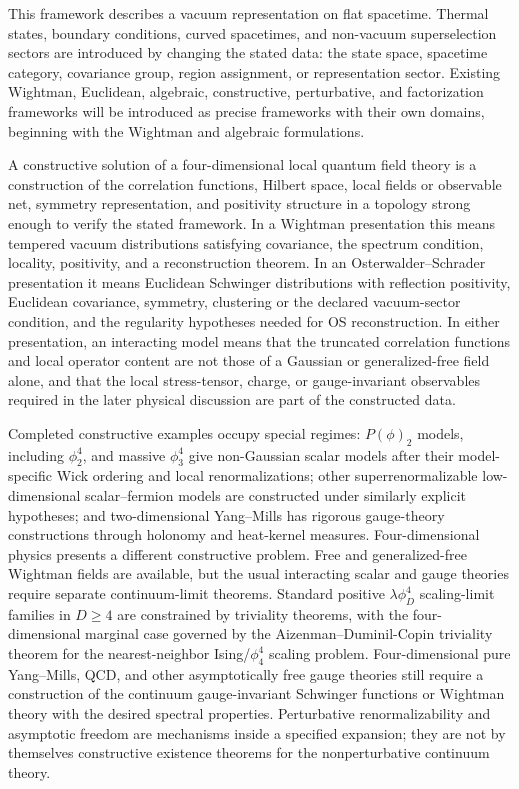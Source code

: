 This framework describes a vacuum representation on flat spacetime. Thermal
states, boundary conditions, curved spacetimes, and non-vacuum superselection
sectors are introduced by changing the stated data: the state space, spacetime
category, covariance group, region assignment, or representation sector.
Existing Wightman, Euclidean, algebraic, constructive, perturbative, and
factorization frameworks will be introduced as precise frameworks with their
own domains, beginning with the Wightman and algebraic formulations.

\begin{openproblem}
\label{op:four-dimensional-constructive-qft}
A constructive solution of a four-dimensional local quantum field theory is a
construction of the correlation functions, Hilbert space, local fields or
observable net, symmetry representation, and positivity structure in a topology
strong enough to verify the stated framework.  In a Wightman presentation this
means tempered vacuum distributions satisfying covariance, the spectrum
condition, locality, positivity, and a reconstruction theorem.  In an
Osterwalder--Schrader presentation it means Euclidean Schwinger distributions
with reflection positivity, Euclidean covariance, symmetry, clustering or the
declared vacuum-sector condition, and the regularity hypotheses needed for
OS reconstruction.  In either presentation, an interacting model means that the
truncated correlation functions and local operator content are not those of a
Gaussian or generalized-free field alone, and that the local stress-tensor,
charge, or gauge-invariant observables required in the later physical
discussion are part of the constructed data.

Completed constructive examples occupy special regimes: \(P(\phi)_2\) models,
including \(\phi^4_2\), and massive \(\phi^4_3\) give non-Gaussian scalar
models after their model-specific Wick ordering and local renormalizations;
other superrenormalizable low-dimensional scalar--fermion models are
constructed under similarly explicit hypotheses; and two-dimensional
Yang--Mills has rigorous gauge-theory constructions through holonomy and
heat-kernel measures.  Four-dimensional physics presents a different
constructive problem.  Free and generalized-free Wightman fields are available,
but the usual interacting scalar and gauge theories require separate
continuum-limit theorems.  Standard positive \(\lambda\phi^4_D\) scaling-limit
families in \(D\geq4\) are constrained by triviality theorems, with the
four-dimensional marginal case governed by the Aizenman--Duminil-Copin
triviality theorem for the nearest-neighbor Ising/\(\phi^4_4\) scaling
problem.
Four-dimensional pure Yang--Mills, QCD, and other asymptotically free gauge
theories still require a construction of the continuum gauge-invariant
Schwinger functions or Wightman theory with the desired spectral properties.
Perturbative renormalizability and asymptotic freedom are mechanisms inside a
specified expansion; they are not by themselves constructive existence
theorems for the nonperturbative continuum theory.
\end{openproblem}

